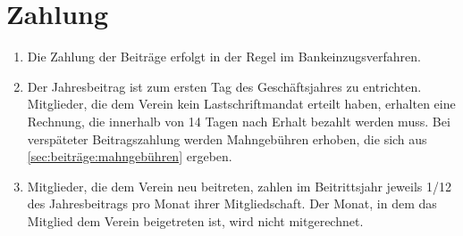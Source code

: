 \documentclass[12pt,paper=a4,ngerman]{scrreprt}
\begin{document}
	\section{Zahlung}
	    \begin{enumerate}
            \item
                Die Zahlung der Beiträge erfolgt in der Regel im Bankeinzugsverfahren.
            \item
                Der Jahresbeitrag ist zum ersten Tag des Geschäftsjahres zu entrichten. Mitglieder, die dem Verein kein Lastschriftmandat erteilt haben, erhalten eine Rechnung, die innerhalb von 14 Tagen nach Erhalt bezahlt werden muss. Bei verspäteter Beitragszahlung werden Mahngebühren erhoben, die sich aus \ref{sec:beiträge:mahngebühren} ergeben.
            \item
                Mitglieder, die dem Verein neu beitreten, zahlen im Beitrittsjahr jeweils 1/12 des Jahresbeitrags pro Monat ihrer Mitgliedschaft. Der Monat, in dem das Mitglied dem Verein beigetreten ist, wird nicht mitgerechnet.
	    \end{enumerate}
	        
\end{document}
